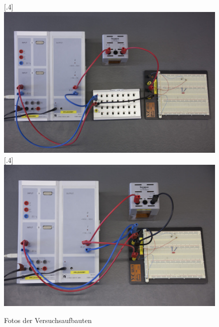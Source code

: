 \begin{figure}
\centering
    [.4\linewidth]
            {\includegraphics[width=.4\textwidth]{images/durchlassfilter.jpg}}
    [.4\linewidth]
            {\includegraphics[width=.4\textwidth]{images/sperrfilter.jpg}}
\caption{Fotos der Versuchsaufbauten}
\end{figure}

